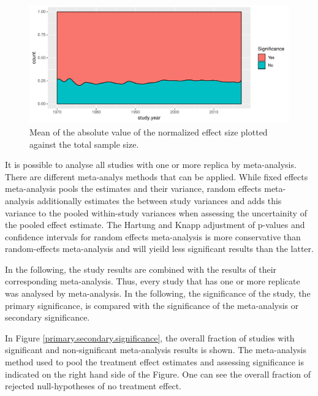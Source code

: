\documentclass[11pt,a4paper,twoside]{book}\usepackage[]{graphicx}\usepackage[]{color}
\newenvironment{knitrout}{}{} %
\begin{document}
\begin{figure}
\begin{knitrout}
\color{fgcolor}

{\centering \includegraphics[width=\textwidth-3cm]{figure/ch02_figunnamed-chunk-18-1} 

}



\end{knitrout}
\caption{Mean of the absolute value of the normalized effect size plotted against the total sample size.}
\label{study.significance.overtime}
\end{figure}

It is possible to analyse all studies with one or more replica by meta-analysis. There are different meta-analys methods that can be applied. While fixed effects meta-analysis pools the estimates and their variance, random effects meta-analysis additionally estimates the between study variances and adds this variance to the pooled within-study variances when assessing the uncertainity of the pooled effect estimate. The Hartung and Knapp adjustment of p-values and confidence intervals for random effects meta-analysis is more conservative than random-effects meta-analysis and will yieild less significant results than the latter.

\vspace{0mm}
In the following, the study results are combined with the results of their corresponding meta-analysis. Thus, every study that has one or more replicate was analysed by meta-analysis. In the following, the significance of the study, the primary significance, is compared with the significance of the meta-analysis or secondary significance.

\vspace{0mm}
In Figure \ref{primary.secondary.significance}, the overall fraction of studies with significant and non-significant meta-analysis results is shown. The meta-analysis method used to pool the treatment effect estimates and assessing significance is indicated on the right hand side of the Figure. One can see the overall fraction of rejected null-hypotheses of no treatment effect.
\end{document}
